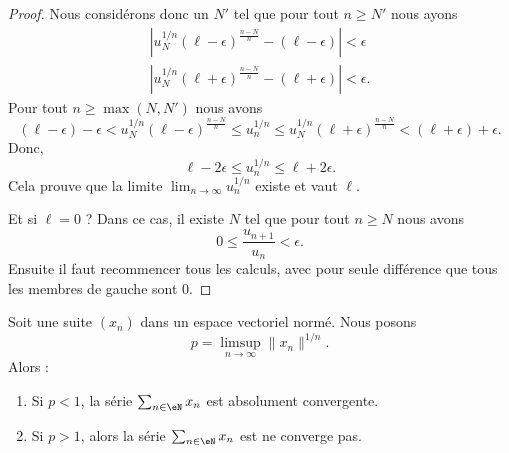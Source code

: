 \begin{proof}
	Nous considérons donc un \( N'\) tel que pour tout \( n\geq N'\) nous ayons
	\begin{subequations}
		\begin{align}
			\left| u_N^{1/n}(\ell-\epsilon)^{\frac{ n-N }{ n }}-(\ell-\epsilon) \right| <\epsilon \\
			\left| u_N^{1/n}(\ell+\epsilon)^{\frac{ n-N }{ n }}-(\ell+\epsilon) \right| <\epsilon.
		\end{align}
	\end{subequations}
	Pour tout \( n\geq\max(N,N')\) nous avons
	\begin{equation}
		(\ell-\epsilon)-\epsilon<u_N^{1/n}(\ell-\epsilon)^{\frac{ n-N }{ n }}\leq u_n^{1/n}\leq u_N^{1/n}(\ell+\epsilon)^{\frac{ n-N }{ n }}<(\ell+\epsilon)+\epsilon.
	\end{equation}
	Donc,
	\begin{equation}
		\ell-2\epsilon\leq u_n^{1/n}\leq \ell+2\epsilon.
	\end{equation}
	Cela prouve que la limite \( \lim_{n\to \infty} u_n^{1/n}\) existe et vaut \( \ell\).

	Et si \( \ell=0\) ? Dans ce cas, il existe \( N\) tel que pour tout \( n\geq N\) nous avons
	\begin{equation}
		0\leq \frac{ u_{n+1} }{ u_n }<\epsilon.
	\end{equation}
	Ensuite il faut recommencer tous les calculs, avec pour seule différence que tous les membres de gauche sont \( 0\).
\end{proof}


\begin{lemma}        \label{LEMooDWNZooXwejrF}
	Soit une suite \( (x_n)\) dans un espace vectoriel normé. Nous posons
	\begin{equation}
		p=\limsup_{n\to \infty}\| x_n \|^{1/n}.
	\end{equation}
	Alors :
	\begin{enumerate}
		\item       \label{ITEMooZZBIooUYrtYL}
		      Si \( p<1\), la série \( \sum_{n\in \eN}x_n\) est absolument convergente.
		\item       \label{ITEMooQGKNooOFeFRd}
		      Si \( p>1\), alors la série \( \sum_{n\in \eN}x_n\) est ne converge pas.
	\end{enumerate}
\end{lemma}

